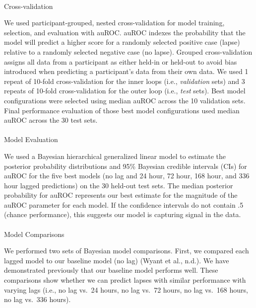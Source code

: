 \documentclass[
]{agujournal2019}
\makeatletter
\let\oldparagraph\paragraph
\renewcommand{\paragraph}{
    \@ifstar
      \xxxParagraphStar
      \xxxParagraphNoStar
  }
\newcommand{\xxxParagraphStar}[1]{\oldparagraph*{#1}\mbox{}}
\newcommand{\xxxParagraphNoStar}[1]{\oldparagraph{#1}\mbox{}}
\makeatother
\begin{document}
\paragraph{Cross-validation}\label{cross-validation}

We used participant-grouped, nested cross-validation for model training,
selection, and evaluation with auROC. auROC indexes the probability that
the model will predict a higher score for a randomly selected positive
case (lapse) relative to a randomly selected negative case (no lapse).
Grouped cross-validation assigns all data from a participant as either
held-in or held-out to avoid bias introduced when predicting a
participant's data from their own data. We used 1 repeat of 10-fold
cross-validation for the inner loops (i.e., \emph{validation} sets) and
3 repeats of 10-fold cross-validation for the outer loop (i.e.,
\emph{test} sets). Best model configurations were selected using median
auROC across the 10 validation sets. Final performance evaluation of
those best model configurations used median auROC across the 30 test
sets.

\paragraph{Model Evaluation}\label{model-evaluation}

We used a Bayesian hierarchical generalized linear model to estimate the
posterior probability distributions and 95\% Bayesian credible intervals
(CIs) for auROC for the five best models (no lag and 24 hour, 72 hour,
168 hour, and 336 hour lagged predictions) on the 30 held-out test sets.
The median posterior probability for auROC represents our best estimate
for the magnitude of the auROC parameter for each model. If the
confidence intervals do not contain .5 (chance performance), this
suggests our model is capturing signal in the data.

\paragraph{Model Comparisons}\label{model-comparisons}

We performed two sets of Bayesian model comparisons. First, we compared
each lagged model to our baseline model (no lag) (Wyant et al., n.d.).
We have demonstrated previously that our baseline model performs well.
These comparisons show whether we can predict lapses with similar
performance with varying lags (i.e., no lag vs.~24 hours, no lag vs.~72
hours, no lag vs.~168 hours, no lag vs.~336 hours).
\end{document}
